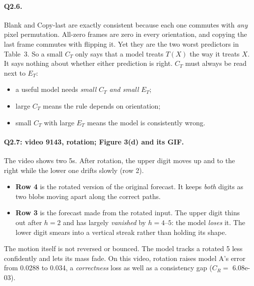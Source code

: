 \documentclass[11pt,a4paper]{article}
\begin{document}
\paragraph{Q2.6.} Blank and Copy-last are exactly consistent because each one
commutes with \emph{any} pixel permutation. All-zero frames are zero in every
orientation, and copying the last frame commutes with flipping it. Yet they are
the two worst predictors in Table~3. So a small $C_T$ only says that a model
treats $T(X)$ the way it treats $X$. It says nothing about whether either
prediction is right. $C_T$ must always be read next to $E_T$:
\begin{itemize}
  \item a useful model needs \emph{small $C_T$ and small $E_T$};
  \item large $C_T$ means the rule depends on orientation;
  \item small $C_T$ with large $E_T$ means the model is consistently wrong.
\end{itemize}

\paragraph{Q2.7: video 9143, rotation; Figure 3(d) and its GIF.} The video
shows two 5s. After rotation, the upper digit moves up and to the right while
the lower one drifts slowly (row 2).
\begin{itemize}
  \item \textbf{Row 4} is the rotated version of the original forecast. It keeps
        \emph{both} digits as two blobs moving apart along the correct paths.
  \item \textbf{Row 3} is the forecast made from the rotated input. The upper
        digit thins out after $h=2$ and has largely \emph{vanished} by
        $h=4$--$5$: the model \emph{loses} it. The lower digit smears into a
        vertical streak rather than holding its shape.
\end{itemize}
The motion itself is not reversed or bounced. The model tracks a rotated 5
less confidently and lets its mass fade. On this video, rotation raises model
A's error from 0.0288 to 0.034, a \emph{correctness} loss as well as a
consistency gap ($C_R=$ 6.08e-03).
\end{document}

